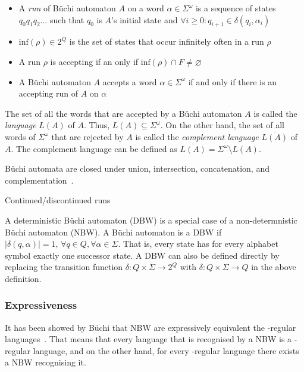 \begin{itemize}
\item A \emph{run} of Büchi automaton $A$ on a word $\alpha \in \Sigma^\omega$ is a sequence of states $q_0q_1q_2\dots$ such that $q_0$ is $A$'s initial state and $\forall i \geq 0: q_{i+1} \in \delta(q_i, \alpha_i)$
\item $\textrm{inf}(\rho) \in 2^Q$ is the set of states that occur infinitely often in a run $\rho$
\item A run $\rho$ is accepting if an only if $\textrm{inf}(\rho) \cap F \neq \varnothing$
\item A Büchi automaton $A$ accepts a word $\alpha \in \Sigma^\omega$ if and only if there is an accepting run of $A$ on $\alpha$
\end{itemize}

The set of all the words that are accepted by a Büchi automaton $A$ is called the \emph{language} $L(A)$ of $A$. Thus, $L(A) \subseteq \Sigma^\omega$. On the other hand, the set of all words of $\Sigma^\omega$ that are rejected by $A$ is called the \emph{complement language} $\overline{L(A)}$ of $A$. The complement language can be defined as $\overline{L(A)} = \Sigma^\omega \setminus L(A)$.

Büchi automata are closed under union, intersection, concatenation, and complementation~\cite{1996_vardi}.

Continued/discontinued runs

A deterministic Büchi automaton (DBW) is a special case of a non-determnistic Büchi automaton (NBW). A Büchi automaton is a DBW if $|\delta(q,\alpha)| = 1, \, \forall q \in Q, \forall \alpha \in \Sigma $. That is, every state has for every alphabet symbol exactly one successor state. A DBW can also be defined directly by replacing the transition function $\delta: Q \times \Sigma \rightarrow 2^Q$ with $\delta: Q \times \Sigma \rightarrow Q$ in the above definition.

\subsubsection{Expressiveness}
It has been showed by Büchi that NBW are expressively equivalent the \om-regular languages~\cite{buchi1960decision}. That means that every language that is recognised by a NBW is a \om-regular language, and on the other hand, for every \om-regular language there exists a NBW recognising it.

